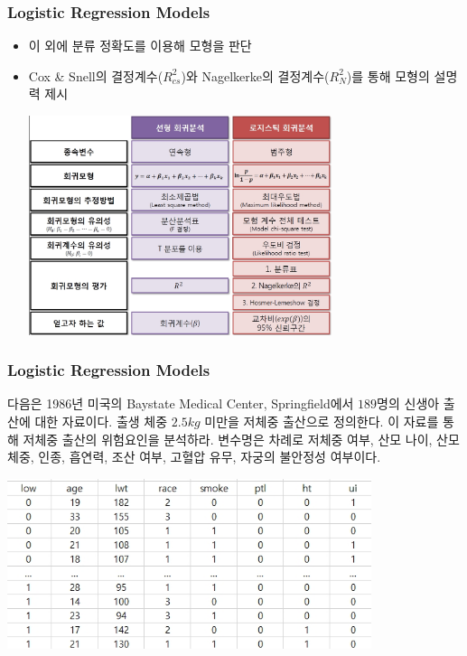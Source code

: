 \documentclass[10pt,xcolor={svgnames},t]{beamer}
\begin{document}
%
%
\begin{frame}
	\frametitle{Logistic Regression Models}
	
	\begin{itemize}
		\item 이 외에 분류 정확도를 이용해 모형을 판단
		\item Cox \& Snell의 결정계수($R_{cs}^2$)와 Nagelkerke의 결정계수($R_N^2$)를 통해 모형의 설명력 제시 
						\begin{center}
							\includegraphics[width=0.7\textwidth]{lo9.jpg}
						\end{center}
	\end{itemize}
	
	
\end{frame}
%

\begin{frame}
	\frametitle{Logistic Regression Models}
	
	\begin{example}
		다음은 1986년 미국의 Baystate Medical Center, Springfield에서 $189$명의 신생아 출산에 대한 자료이다. 출생 체중 $2.5kg$ 미만을 저체중 출산으로 정의한다. 이 자료를 통해 저체중 출산의 위험요인을 분석하라. 변수명은 차례로 저체중 여부, 산모 나이, 산모 체중, 인종, 흡연력, 조산 여부, 고혈압 유무, 자궁의 불안정성 여부이다.
		\begin{center}
			\includegraphics[width=0.8\textwidth]{ex1.jpg}
		\end{center}
	\end{example}
	
\end{frame}
\end{document}
